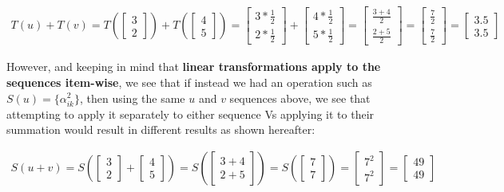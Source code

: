 \documentclass[a4paper, 18pt]{book} %
\begin{document}
\begin{appendices}
\begin{multline}
\label{EQTRANSLINALG2}
T(u) + T(v) = T\left( \begin{bmatrix}3\\2\end{bmatrix} \right) +  T\left( \begin{bmatrix}4\\5\end{bmatrix} \right) = \begin{bmatrix}3*\frac{1}{2}\\2*\frac{1}{2}\end{bmatrix}  +   \begin{bmatrix}4*\frac{1}{2}\\5*\frac{1}{2}\end{bmatrix} = \begin{bmatrix}\frac{3+4}{2}\\\frac{2+5}{2}\end{bmatrix} = \begin{bmatrix}\frac{7}{2}\\\frac{7}{2}\end{bmatrix} = \begin{bmatrix}3.5\\3.5\end{bmatrix}
\end{multline}


\vspace{2em}

However, and keeping in mind that \textbf{linear transformations apply to the sequences item-wise}, we see that if instead we had an operation such as $S(u) = \{\alpha_{ik}^2\}$, then using the same $u$ and $v$ sequences above, we see that attempting to apply it separately to either sequence Vs applying it to their summation would result in different results as shown hereafter:


\vspace{2em}


\begin{multline}
\label{EQSQUARTRANS1}
S(u+v) = S\left( \begin{bmatrix}3\\2\end{bmatrix} +  \begin{bmatrix}4\\5\end{bmatrix} \right) =  S\left( \begin{bmatrix}3+4\\2+5\end{bmatrix} \right) = S\left( \begin{bmatrix}7\\7\end{bmatrix} \right) = \begin{bmatrix}7^2\\7^2\end{bmatrix} = \begin{bmatrix}49\\49\end{bmatrix}
\end{multline}



\end{appendices}
\end{document}

